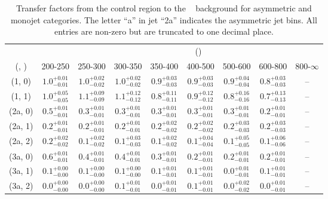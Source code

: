\begin{table}[h!]
\tiny
\centering
\caption{Transfer factors from the \mj control region to the \zInv~ background for asymmetric and monojet categories. The letter ``a'' in jet \eg ``2a''  indicates the asymmetric jet bins. All entries are non-zero but are truncated to one decimal place.\label{tab:tf_mu_zinv_asym}}
\begin{tabular}
{ccccccccc}
	\hline\hline
&	& \multicolumn{8}{c}{\scalht (\gev)} \\ 
	 (\njet,  \nb) & 200-250 & 250-300 & 300-350 & 350-400 & 400-500 & 500-600 & 600-800 & 800-$\infty$ \\ [0.8ex] 
\hline
	(1, 0) & $1.0^{+ 0.01 }_{- 0.01 }$ & $1.0^{+ 0.02 }_{- 0.02 }$ & $1.0^{+ 0.02 }_{- 0.02 }$ & $0.9^{+ 0.03 }_{- 0.03 }$ & $0.9^{+ 0.03 }_{- 0.03 }$ & $0.9^{+ 0.04 }_{- 0.04 }$ & $0.8^{+ 0.03 }_{- 0.03 }$ & -- \\[0.5ex] 
	(1, 1) & $1.0^{+ 0.05 }_{- 0.05 }$ & $1.1^{+ 0.09 }_{- 0.09 }$ & $1.1^{+ 0.12 }_{- 0.12 }$ & $0.8^{+ 0.11 }_{- 0.11 }$ & $0.9^{+ 0.12 }_{- 0.12 }$ & $0.8^{+ 0.16 }_{- 0.16 }$ & $0.7^{+ 0.13 }_{- 0.13 }$ & -- \\[0.5ex] 
	(2a, 0) & $0.5^{+ 0.01 }_{- 0.01 }$ & $0.3^{+ 0.01 }_{- 0.01 }$ & $0.3^{+ 0.01 }_{- 0.01 }$ & $0.3^{+ 0.01 }_{- 0.01 }$ & $0.3^{+ 0.01 }_{- 0.01 }$ & $0.3^{+ 0.01 }_{- 0.01 }$ & $0.2^{+ 0.01 }_{- 0.01 }$ & -- \\[0.5ex] 
	(2a, 1) & $0.2^{+ 0.01 }_{- 0.01 }$ & $0.2^{+ 0.01 }_{- 0.01 }$ & $0.2^{+ 0.01 }_{- 0.01 }$ & $0.2^{+ 0.02 }_{- 0.02 }$ & $0.2^{+ 0.02 }_{- 0.02 }$ & $0.2^{+ 0.03 }_{- 0.03 }$ & $0.2^{+ 0.03 }_{- 0.03 }$ & -- \\[0.5ex] 
	(2a, 2) & $0.2^{+ 0.02 }_{- 0.02 }$ & $0.1^{+ 0.02 }_{- 0.02 }$ & $0.1^{+ 0.03 }_{- 0.03 }$ & $0.1^{+ 0.02 }_{- 0.02 }$ & $0.1^{+ 0.04 }_{- 0.04 }$ & $0.1^{+ 0.05 }_{- 0.05 }$ & $0.1^{+ 0.06 }_{- 0.06 }$ & -- \\[0.5ex] 
	(3a, 0) & $0.6^{+ 0.01 }_{- 0.01 }$ & $0.4^{+ 0.01 }_{- 0.01 }$ & $0.4^{+ 0.01 }_{- 0.01 }$ & $0.3^{+ 0.01 }_{- 0.01 }$ & $0.2^{+ 0.01 }_{- 0.01 }$ & $0.2^{+ 0.01 }_{- 0.01 }$ & $0.2^{+ 0.01 }_{- 0.01 }$ & -- \\[0.5ex] 
	(3a, 1) & $0.1^{+ 0.00 }_{- 0.00 }$ & $0.1^{+ 0.00 }_{- 0.00 }$ & $0.1^{+ 0.00 }_{- 0.00 }$ & $0.1^{+ 0.01 }_{- 0.01 }$ & $0.1^{+ 0.01 }_{- 0.01 }$ & $0.0^{+ 0.01 }_{- 0.01 }$ & $0.1^{+ 0.01 }_{- 0.01 }$ & -- \\[0.5ex] 
	(3a, 2) & $0.0^{+ 0.00 }_{- 0.00 }$ & $0.0^{+ 0.00 }_{- 0.00 }$ & $0.1^{+ 0.01 }_{- 0.01 }$ & $0.0^{+ 0.01 }_{- 0.01 }$ & $0.1^{+ 0.01 }_{- 0.01 }$ & $0.0^{+ 0.02 }_{- 0.02 }$ & $0.0^{+ 0.01 }_{- 0.01 }$ & -- \\[0.5ex] 

\end{tabular}
\end{table}
